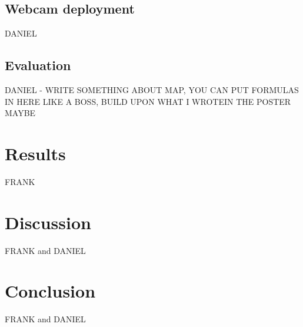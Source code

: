 \documentclass[a4paper]{article}
\begin{document}
\subsection{Webcam deployment}
DANIEL
\subsection{Evaluation}
DANIEL - WRITE SOMETHING ABOUT MAP, YOU CAN PUT FORMULAS IN HERE LIKE A BOSS, BUILD UPON WHAT I WROTEIN THE POSTER MAYBE
\section{Results}
FRANK 
\section{Discussion}
FRANK and DANIEL
\section{Conclusion}
FRANK and DANIEL
\end{document}
